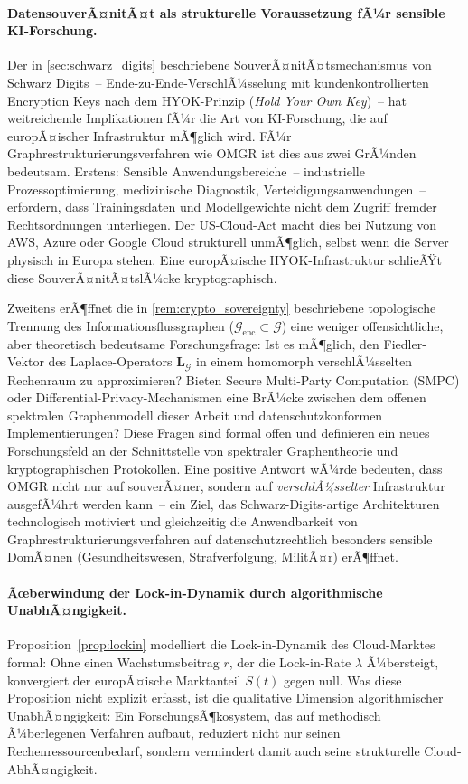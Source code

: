 ﻿\documentclass[12pt, a4paper, openany]{report}
\newcommand{\calG}{\mathcal{G}}
\begin{document}
\paragraph{DatensouverÃ¤nitÃ¤t als strukturelle Voraussetzung fÃ¼r
  sensible KI-Forschung.}
Der in \cref{sec:schwarz_digits} beschriebene SouverÃ¤nitÃ¤tsmechanismus
von Schwarz Digits~-- Ende-zu-Ende-VerschlÃ¼sselung mit
kundenkontrollierten Encryption Keys nach dem HYOK-Prinzip
(\textit{Hold Your Own Key})~-- hat weitreichende Implikationen fÃ¼r die
Art von KI-Forschung, die auf europÃ¤ischer Infrastruktur mÃ¶glich wird.
FÃ¼r Graphrestrukturierungsverfahren wie OMGR ist dies aus zwei GrÃ¼nden
bedeutsam.  Erstens: Sensible Anwendungsbereiche~-- industrielle
Prozessoptimierung, medizinische Diagnostik,
Verteidigungsanwendungen~-- erfordern, dass Trainingsdaten und
Modellgewichte nicht dem Zugriff fremder Rechtsordnungen unterliegen.
Der US-Cloud-Act macht dies bei Nutzung von AWS, Azure oder Google
Cloud strukturell unmÃ¶glich, selbst wenn die Server physisch in Europa
stehen.  Eine europÃ¤ische HYOK-Infrastruktur schlieÃŸt diese
SouverÃ¤nitÃ¤tslÃ¼cke kryptographisch.

Zweitens erÃ¶ffnet die in \cref{rem:crypto_sovereignty} beschriebene
topologische Trennung des Informationsflussgraphen
($\calG_{\mathrm{enc}} \subset \calG$) eine weniger offensichtliche,
aber theoretisch bedeutsame Forschungsfrage: Ist es mÃ¶glich, den
Fiedler-Vektor des Laplace-Operators $\bm{L}_{\calG}$ in einem
homomorph verschlÃ¼sselten Rechenraum zu approximieren?  Bieten Secure
Multi-Party Computation (SMPC) oder Differential-Privacy-Mechanismen
eine BrÃ¼cke zwischen dem offenen spektralen Graphenmodell dieser Arbeit
und datenschutzkonformen Implementierungen?  Diese Fragen sind formal
offen und definieren ein neues Forschungsfeld an der Schnittstelle von
spektraler Graphentheorie und kryptographischen Protokollen.  Eine
positive Antwort wÃ¼rde bedeuten, dass OMGR nicht nur auf souverÃ¤ner,
sondern auf \emph{verschlÃ¼sselter} Infrastruktur ausgefÃ¼hrt werden
kann~-- ein Ziel, das Schwarz-Digits-artige Architekturen technologisch
motiviert und gleichzeitig die Anwendbarkeit von
Graphrestrukturierungsverfahren auf datenschutzrechtlich besonders
sensible DomÃ¤nen (Gesundheitswesen, Strafverfolgung, MilitÃ¤r) erÃ¶ffnet.

\paragraph{Ãœberwindung der Lock-in-Dynamik durch algorithmische
  UnabhÃ¤ngigkeit.}
Proposition~\ref{prop:lockin} modelliert die Lock-in-Dynamik des
Cloud-Marktes formal: Ohne einen Wachstumsbeitrag $r$, der die
Lock-in-Rate $\lambda$ Ã¼bersteigt, konvergiert der europÃ¤ische
Marktanteil $S(t)$ gegen null.  Was diese Proposition nicht explizit
erfasst, ist die qualitative Dimension algorithmischer UnabhÃ¤ngigkeit:
Ein ForschungsÃ¶kosystem, das auf methodisch Ã¼berlegenen Verfahren
aufbaut, reduziert nicht nur seinen Rechenressourcenbedarf, sondern
vermindert damit auch seine strukturelle Cloud-AbhÃ¤ngigkeit.
\end{document}
